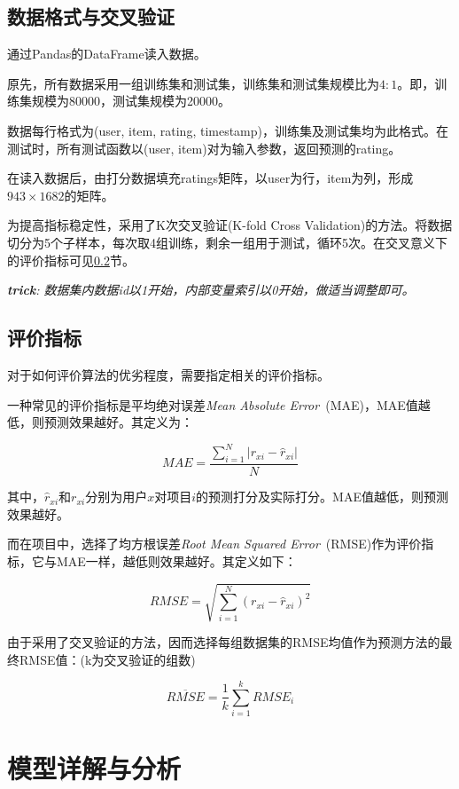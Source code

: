 \documentclass[utf8, a4paper, 11pt, onecolumn]{ctexart}
\begin{document}
\begin{spacing}{1.25}
\subsection{数据格式与交叉验证}

通过Pandas的DataFrame读入数据。

原先，所有数据采用一组训练集和测试集，训练集和测试集规模比为$4:1$。即，训练集规模为80000，测试集规模为20000。

数据每行格式为(user, item, rating, timestamp)，训练集及测试集均为此格式。在测试时，所有测试函数以(user, item)对为输入参数，返回预测的rating。

在读入数据后，由打分数据填充ratings矩阵，以user为行，item为列，形成$943 \times 1682$的矩阵。

为提高指标稳定性，采用了K次交叉验证(K-fold Cross Validation)的方法。将数据切分为5个子样本，每次取4组训练，剩余一组用于测试，循环5次。在交叉意义下的评价指标可见\ref{评价指标}节。

\textit{\textbf{trick}: 数据集内数据id以1开始，内部变量索引以0开始，做适当调整即可。}

\subsection{评价指标}
\label{评价指标}

对于如何评价算法的优劣程度，需要指定相关的评价指标。

一种常见的评价指标是平均绝对误差\textit{Mean Absolute Error}\ (MAE)，MAE值越低，则预测效果越好。其定义为：

\[MAE =\frac{\sum_{i=1}^{N} \lvert r_{xi} - \hat{r}_{xi}\rvert}{N} \]

其中，$\hat{r}_{xi}$和$r_{xi}$分别为用户$x$对项目$i$的预测打分及实际打分。MAE值越低，则预测效果越好。

而在项目中，选择了均方根误差\textit{Root Mean Squared Error}\ (RMSE)作为评价指标，它与MAE一样，越低则效果越好。其定义如下：

\[RMSE = \sqrt{\sum_{i = 1}^{N}(r_{xi} - \hat{r}_{xi})^{2}}\]


由于采用了交叉验证的方法，因而选择每组数据集的RMSE均值作为预测方法的最终RMSE值：(k为交叉验证的组数)

\[\overline{RMSE} = \frac{1}{k}\sum_{i=1}^{k}RMSE_{i}\]

\section{模型详解与分析}
\label{模型详解}


\end{spacing}
\end{document}
